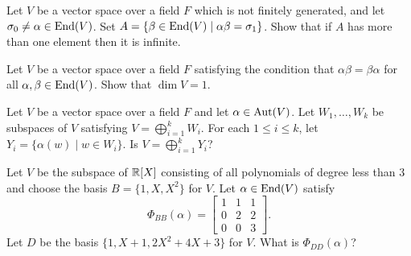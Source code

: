 \probskip

\begin{problem}[Golan 338]
Let $V$ be a vector space over a field $F$ which is not finitely generated, and
let $\sigma_0 \neq \alpha \in \operatorname{End}(V)$.  Set 
$A = \{\beta \in \operatorname{End}(V) \mid \alpha \beta = \sigma_1\}$.  Show that if $A$ has
more than one element then it is infinite.
\end{problem}

\probskip

\begin{problem}[Golan 340]
Let $V$ be a vector space over a field $F$ satisfying the condition that
$\alpha\beta = \beta\alpha$ for all $\alpha, \beta \in \operatorname{End}(V)$. Show that
$\dim{V} = 1$.
\end{problem}

\probskip

\begin{problem}[Golan 354]
Let $V$ be a vector space over a field $F$ and let $\alpha \in \operatorname{Aut}(V)$.  Let
$W_1, \dots, W_k$ be subspaces of $V$ satisfying $V = \bigoplus_{i=1}^k W_i$.
For each $1\leq i \leq k$, let $Y_i = \{\alpha(w) \mid w \in W_i\}$.
Is $V = \bigoplus_{i=1}^k Y_i$?
\end{problem}

\begin{ex}[Golan 415]
Let $V$ be the subspace of $\mathbb{R}[X]$ consisting of all polynomials of degree less
than 3 and choose the basis $B = \{1, X, X^2\}$ for $V$. Let $\alpha \in \operatorname{End}(V)$ satisfy
\[
\Phi_{BB}(\alpha) = 
\begin{bmatrix} 
1 & 1 & 1\\ 
0 & 2 & 2\\
0 & 0 & 3
\end{bmatrix}.
\]
Let $D$ be the basis $\{1, X+1, 2X^2 + 4X + 3\}$ for $V$.  What is $\Phi_{DD}(\alpha)$?
\end{ex}

